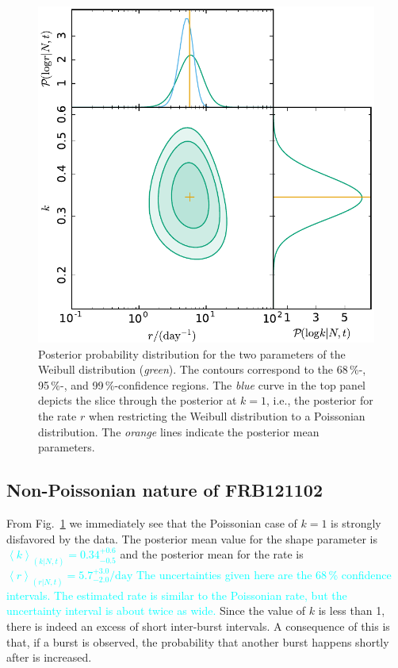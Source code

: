\documentclass[fleqn,usenatbib]{mnras}
\newcommand{\new}[1]{\textcolor{cyan}{#1}}
\begin{document}
\begin{figure}
	\includegraphics[width=1.0\columnwidth]{2dpost.pdf}
	\caption{\label{fig:result}Posterior probability distribution for the two parameters of the Weibull distribution (\emph{green}). The contours correspond to the 68\,\%-, 95\,\%-, and 99\,\%-confidence regions. The \emph{blue} curve in the top panel depicts the slice through the posterior at $k=1$, i.e., the posterior for the rate $r$ when restricting the Weibull distribution to a Poissonian distribution. The \emph{orange} lines indicate the posterior mean parameters.}
\end{figure}


\subsection{Non-Poissonian nature of FRB121102}
\label{sec:non-poissonian}

From Fig.~\ref{fig:result} we immediately see that the Poissonian case of $k=1$ is strongly disfavored by the data. The posterior mean value for the shape parameter is \new{$\left<k\right>_{(k|N,t)} = 0.34^{+0.6}_{-0.5}$} and the posterior mean for the rate is \new{$\left<r\right>_{(r|N,t)} = 5.7^{+3.0}_{-2.0}/\mathrm{day}$ The uncertainties given here are the 68\,\% confidence intervals. The estimated rate is similar to the Poissonian rate, but the uncertainty interval is about twice as wide.} Since the value of $k$ is less than 1, there is indeed an excess of short inter-burst intervals. A consequence of this is that, if a burst is observed, the probability that another burst happens shortly after is increased.
\end{document}
